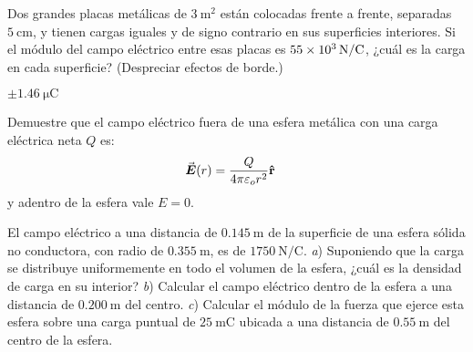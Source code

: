 \begin{center}
\end{center}
%
\begin{Exercise}
  Dos grandes placas metálicas de $\SI{3}{\metre\squared}$ están colocadas frente a frente, separadas $\SI{5}{\centi\metre}$, y tienen cargas iguales y de signo contrario en sus superficies interiores. Si el módulo del campo eléctrico entre esas placas es $\SI{55E3}{\newton/\coulomb}$, ¿cuál es la carga en cada superficie? (Despreciar efectos de borde.)
\end{Exercise}
\begin{Answer}
  $\pm\SI{1.46}{\micro\coulomb}$
\end{Answer}
%
\begin{Exercise}
  Demuestre que el campo eléctrico fuera de una esfera metálica con una carga eléctrica neta $Q$ es:
  \begin{align*}
    \va*{E}(r) &= \frac{Q}{4\pi\varepsilon_o r^2} \vu{r}
  \end{align*}
  y adentro de la esfera vale $E = 0$.
\end{Exercise}
%
\begin{Exercise}
  El campo eléctrico a una distancia de $\SI{0.145}{\metre}$ de la superficie de una esfera sólida no conductora, con radio de $\SI{0.355}{\metre}$, es de $\SI{1750}{\newton/\coulomb}$. \textit{a}) Suponiendo que la carga se distribuye uniformemente en todo el volumen de la esfera, ¿cuál es la densidad de carga en su interior? \textit{b}) Calcular el campo eléctrico dentro de la esfera a una distancia de $\SI{0.200}{\metre}$ del centro. \textit{c}) Calcular el módulo de la fuerza que ejerce esta esfera sobre una carga puntual de $\SI{25}{\milli\coulomb}$ ubicada a una distancia de $\SI{0.55}{\metre}$ del centro de la esfera.
\end{Exercise}
